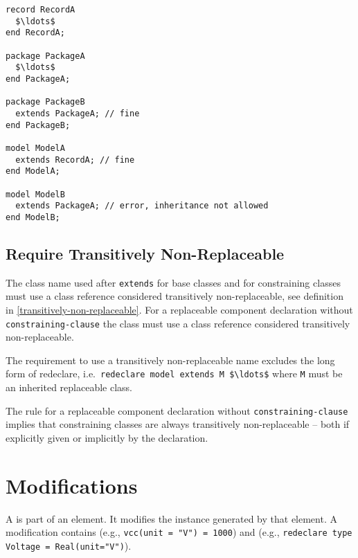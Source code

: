 \begin{example}
\begin{lstlisting}[language=modelica]
record RecordA
  $\ldots$
end RecordA;

package PackageA
  $\ldots$
end PackageA;

package PackageB
  extends PackageA; // fine
end PackageB;

model ModelA
  extends RecordA; // fine
end ModelA;

model ModelB
  extends PackageA; // error, inheritance not allowed
end ModelB;
\end{lstlisting}
\end{example}

\subsection{Require Transitively Non-Replaceable}\label{restrictions-on-base-classes-and-constraining-types-to-be-transitively-non-replaceable}\label{require-transitively-non-replaceable}

The class name used after \lstinline!extends! for base classes and for constraining classes must use a class reference considered transitively non-replaceable, see definition in \cref{transitively-non-replaceable}.
For a replaceable component declaration without \lstinline[language=grammar]!constraining-clause! the class must use a class reference considered transitively non-replaceable.

\begin{nonnormative}
The requirement to use a transitively non-replaceable name excludes the long form of redeclare, i.e.\ \lstinline!redeclare model extends M $\ldots$! where \lstinline!M! must be an inherited replaceable class.
\end{nonnormative}

\begin{nonnormative}
The rule for a replaceable component declaration without \lstinline[language=grammar]!constraining-clause! implies that constraining classes are always transitively non-replaceable -- both
if explicitly given or implicitly by the declaration.
\end{nonnormative}

\section{Modifications}\label{modifications}

A  is part of an element.
It modifies the instance generated by that element.
A modification contains  (e.g., \lstinline!vcc(unit = "V") = 1000!) and  (e.g., \lstinline!redeclare type Voltage = Real(unit="V")!).

